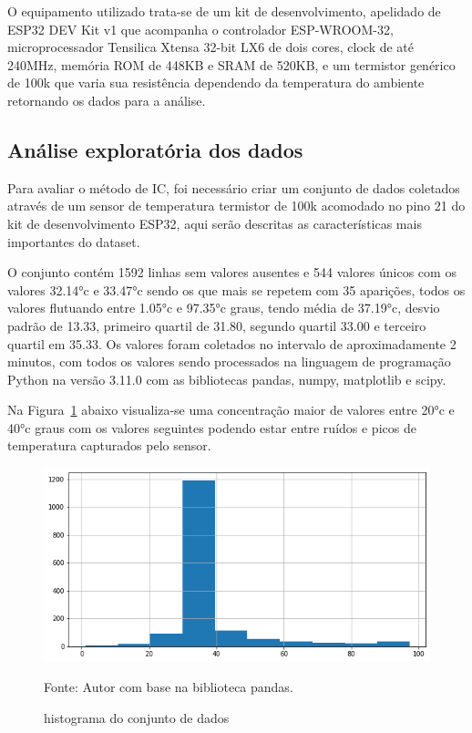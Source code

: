 O equipamento utilizado trata-se de um kit de desenvolvimento, apelidado de ESP32 DEV Kit v1 que acompanha o controlador ESP-WROOM-32, microprocessador Tensilica Xtensa 32-bit LX6 de dois cores, clock de até 240MHz, memória ROM de 448KB e SRAM de 520KB, e um termistor genérico de 100k que varia sua resistência dependendo da temperatura do ambiente retornando os dados para a análise.


\subsection{Análise exploratória dos dados}
Para avaliar o método de IC, foi necessário criar um conjunto de dados coletados através de um sensor de temperatura termistor de 100k acomodado no pino 21 do kit de desenvolvimento ESP32, aqui serão descritas as características mais importantes do dataset.

O conjunto contém 1592 linhas sem valores ausentes e 544 valores únicos com os valores \ang{32.14}c e \ang{33.47}c sendo os que mais se repetem com 35 aparições, todos os valores flutuando entre \ang{1.05}c e \ang{97.35}c graus, tendo média de \ang{37.19}c, desvio padrão de 13.33, primeiro quartil de 31.80, segundo quartil 33.00 e terceiro quartil em 35.33.
Os valores foram coletados no intervalo de aproximadamente 2 minutos, com todos os valores sendo processados na linguagem de programação Python na versão 3.11.0 com as bibliotecas pandas, numpy, matplotlib e scipy.


Na Figura~\ref{fig: hist} abaixo visualiza-se uma concentração maior de valores entre \ang{20}c e \ang{40}c graus com os valores seguintes podendo estar entre ruídos e picos de temperatura capturados pelo sensor. 

\begin{figure}[H]
	\centering
	\includegraphics[width=15cm]{imagens/sensores/hist.png}
	\caption{histograma do conjunto de dados}
	Fonte: Autor com base na biblioteca pandas.
	\label{fig: hist}
\end{figure}

